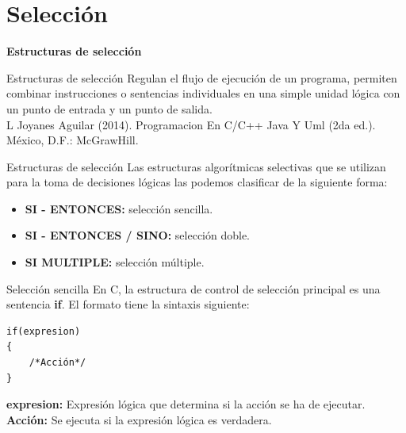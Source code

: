 
\setlength{\parskip}{\baselineskip}
\section*{Selección}

\begin{frame}[c] 
\centering
\huge \textbf{Estructuras de selección}
\end{frame}


\begin{frame}[c]{Estructuras de selección}
	Regulan el flujo de ejecución de un programa, permiten combinar instrucciones o sentencias individuales en una simple unidad lógica con un punto de entrada y un punto de salida.\\
    \vspace*{30mm}
    \tiny L Joyanes Aguilar (2014). Programacion En C/C++ Java Y Uml (2da ed.). México, D.F.: McGrawHill.
\end{frame}


\begin{frame}[c]{Estructuras de selección}
Las estructuras algorítmicas selectivas que se utilizan para la toma de decisiones lógicas las podemos clasificar de la siguiente forma:
\begin{itemize}
    \item \textbf{SI - ENTONCES:} selección sencilla.
    \item \textbf{SI - ENTONCES / SINO:} selección doble.
    \item \textbf{SI MULTIPLE:} selección múltiple.
\end{itemize}
\end{frame}

\begin{frame}[fragile]{Selección sencilla}
En C, la estructura de control de selección principal es una sentencia \textbf{if}. 
El formato tiene la sintaxis siguiente:
\begin{lstlisting}
if(expresion)
{
    /*Acción*/
}
\end{lstlisting}
\textbf{expresion:} Expresión lógica que determina si la acción se ha de ejecutar.\\
\textbf{Acción:} Se ejecuta si la expresión lógica es verdadera.
\end{frame}

